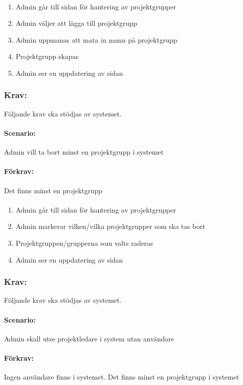 \documentclass[paper=a4, fontsize=11pt,twoside]{article}
\begin{document}
\paragraph{}
\begin{enumerate}
\item Admin går till sidan för hantering av projektgrupper
\item Admin väljer att lägga till projektgrupp
\item Admin uppmanas att mata in namn på projektgrupp
\item Projektgrupp skapas
\item Admin ser en uppdatering av sidan
\end{enumerate}

\subsubsection{Krav:} 
Följande krav ska stödjas av systemet.
\paragraph{Scenario:}
Admin vill ta bort minst en projektgrupp i systemet
\paragraph{Förkrav:}
Det finns minst en projektgrupp
\paragraph{}
\begin{enumerate}
\item Admin går till sidan för hantering av projektgrupper
\item Admin markerar vilken/vilka projektgrupper som ska tas bort
\item Projektgruppen/grupperna som valts raderas
\item Admin ser en uppdatering av sidan
\end{enumerate}

\subsubsection{Krav:} Följande krav ska stödjas av systemet. 
\paragraph{Scenario:}
Admin skall utse projektledare i system utan användare
\paragraph{Förkrav:}
Ingen användare finns i systemet. Det finns minst en projektgrupp i systemet
\end{document}
